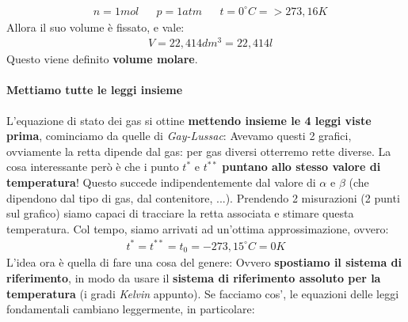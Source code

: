                     \begin{align*}
                        &n = 1mol&&p=1atm&&t=0^\circ C =>273,16 K
                    \end{align*}
                    Allora il suo volume è fissato, e vale:
                    \begin{align*}
                        &V = 22,414 dm^3 = 22,414 l
                    \end{align*}
                    Questo viene definito \textbf{volume molare}.

                \paragraph{Mettiamo tutte le leggi insieme}
                    L'equazione di stato dei gas si ottine \textbf{mettendo insieme le 4 leggi viste prima}, cominciamo da quelle di \textit{Gay-Lussac}:
                    Avevamo questi 2 grafici, ovviamente la retta dipende dal gas: per gas diversi otterremo rette diverse. La cosa interessante però è che i punto $t^*$ e $t^{**}$ \textbf{puntano allo stesso valore di temperatura}! Questo succede indipendentemente dal valore  di $\alpha$ e $\beta$ (che dipendono dal tipo di gas, dal contenitore, ...). Prendendo 2 misurazioni (2 punti sul grafico) siamo capaci di tracciare la retta associata e stimare questa temperatura. Col tempo, siamo arrivati ad un'ottima approssimazione, ovvero:
                    \begin{align*}
                        t^*=t^{**}=t_0=-273,15^\circ C = 0 K
                    \end{align*}
                    L'idea ora è quella di fare una cosa del genere:
                    Ovvero \textbf{spostiamo il sistema di riferimento}, in modo da usare il \textbf{sistema di riferimento assoluto per la temperatura} (i gradi \textit{Kelvin} appunto). Se facciamo cos', le equazioni delle leggi fondamentali cambiano leggermente, in particolare:
